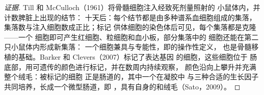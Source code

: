 \begin{proof}[证据]
Till 和 McCulloch（1961）将骨髓细胞注入经致死剂量照射的
小鼠体内，并计数脾脏上出现的结节：
十天后：每个结节都是由多种谱系血细胞组成的集落，
集落数与注入细胞数成正比；标记
供体细胞的染色体后可见，每个集落都是克隆——一个
细胞即可产生红细胞、粒细胞和血小板，部分集落中的
细胞还能在第二只小鼠体内形成新集落：
一个细胞兼具与专能性，即的操作性定义，
也是骨髓移植的基础。Barker 和
Clevers（2007）标记了表达基因 \emph{} 的细胞，这些细胞位于
肠底部，用可遗传的颜色进行标记，并在数周内持续观察，
颜色沿向上攀升并充满整个绒毛：被标记的细胞
正是肠道的，其中一个在凝胶中
与三种合适的生长因子共同培养，长成一个微型肠道，即
\emph{}，具有自身的和绒毛（Sato，2009）。
\end{proof}

